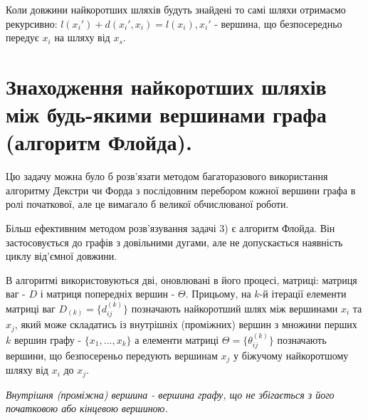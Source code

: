 \documentclass[12pt,a4paper]{article}
\begin{document}
Коли довжини найкоротших шляхів будуть знайдені то самі шляхи отримаємо рекурсивно: $l(x_i')+d(x_i',x_i)=l(x_i), x_i'$ - вершина, що безпосередньо передує $x_i$ на шляху від $x_s$.

\clearpage

\section{Знаходження найкоротших шляхів між будь-якими вершинами графа (алгоритм Флойда).}

Цю задачу можна було б розв’язати методом багаторазового використання алгоритму Декстри чи Форда з послідовним перебором кожної вершини графа в ролі початкової, але це вимагало б великої обчислюваної роботи.

Більш ефективним методом розв’язування задачі 3) є алгоритм Флойда. Він застосовується до графів з довільними дугами, але не допускається наявність циклу від’ємної довжини.

В алгоритмі використовуються дві, оновлювані в його процесі, матриці: матриця ваг - $D$ і матриця попередніх вершин - $\Theta$. Прицьому, на $k$-й ітерації елементи матриці ваг $D_{(k)}=\{d_{ij}^{(k)}\}$ позначають найкоротший шлях між вершинами $x_i$ та $x_j$, який може складатись із внутрішніх (проміжних) вершин з множини перших $k$ вершин графу - $\{x_1, ..., x_k\}$ а елементи матриці $\Theta=\{\theta_{ij}^{(k)}\}$ позначають вершини, що безпосереньо передують вершинам $x_j$ у біжучому найкоротшому шляху від $x_i$ до $x_j$.

\emph{Внутрішня (проміжна) вершина - вершина графу, що не збігається з його початковою або кінцевою вершиною.}
\end{document}
